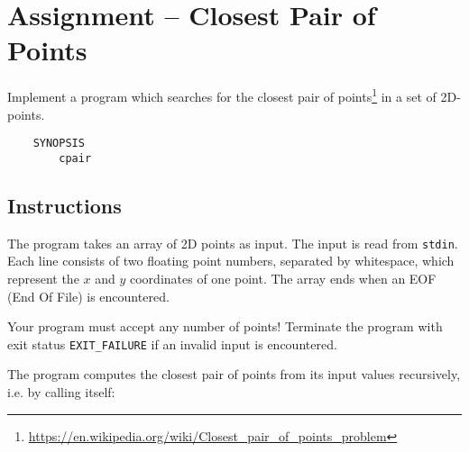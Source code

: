 
\usepackage{amsmath}
\usepackage{multicol}



\section*{Assignment -- Closest Pair of Points}
Implement a program which searches for the closest pair of points\footnote{\url{https://en.wikipedia.org/wiki/Closest\_pair\_of\_points\_problem}}
in a set of 2D-points.
\begin{verbatim}
    SYNOPSIS
        cpair
\end{verbatim}

\subsection*{Instructions}
The program takes an array of 2D points as input.
The input is read from \texttt{stdin}.
Each line consists of two floating point numbers,
separated by whitespace,
which represent the $x$ and $y$ coordinates of one point.
The array ends when an EOF (End Of File) is encountered.

Your program must accept any number of points!
Terminate the program with exit status \verb|EXIT_FAILURE|
if an invalid input is encountered.

The program computes the closest pair of points from its input values recursively,
i.e. by calling itself:

